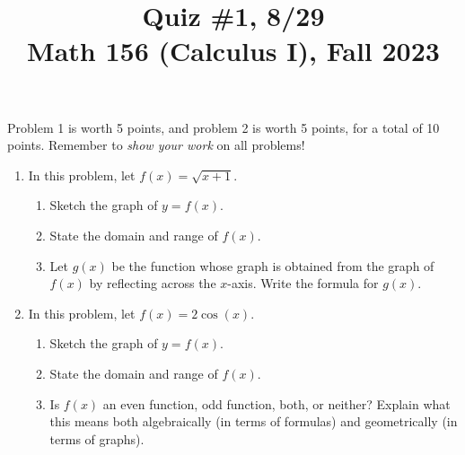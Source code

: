 \documentclass[11pt]{article}
\title{Quiz \#1, 8/29 \\ Math 156 (Calculus I), Fall 2023}
\date{}
\begin{document}
\maketitle

\thispagestyle{empty}

\vspace{-1cm}

Problem 1 is worth 5 points, and problem 2 is worth 5 points, for a total of 10 points. Remember to \emph{show your work} on all problems!

\begin{enumerate}
\item In this problem, let $f(x) = \sqrt{x+1}$.
\begin{enumerate}
\item Sketch the graph of $y=f(x)$.
\item State the domain and range of $f(x)$.
\item Let $g(x)$ be the function whose graph is obtained from the graph of $f(x)$ by reflecting across the $x$-axis. Write the formula for $g(x)$.
\end{enumerate}

\vspace{5cm}

\item In this problem, let $f(x) = 2\cos(x)$.
\begin{enumerate}
\item Sketch the graph of $y=f(x)$.
\item State the domain and range of $f(x)$.
\item Is $f(x)$ an even function, odd function, both, or neither? Explain what this means both algebraically (in terms of formulas) and geometrically (in terms of graphs).
\end{enumerate}

\end{enumerate}
\end{document}
